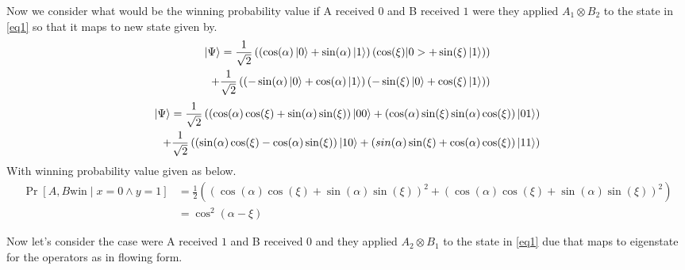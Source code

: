 Now we consider what would be the winning probability value if A received $0$ and B received $1$ were they applied $A_1\otimes B_2$ to the state in \ref{eq1} so that it maps  to new state given by.
\begin{equation*}
\begin{aligned}
\ket{\Psi} = \frac{1}{\sqrt{2}}\left( \left(\cos(\alpha)\ket{0}+\sin(\alpha)\ket{1} \right) \left(\cos(\xi)|0>+\sin(\xi)\ket{1} \right) \right)  \\  
+\frac{1}{\sqrt{2}} \left( \left(-\sin(\alpha)\ket{0}+\cos(\alpha)\ket{1} \right) \left(-\sin(\xi)\ket{0}+\cos(\xi)\ket{1} \right) \right)
\end{aligned}
\end{equation*}
\begin{equation*}
\begin{aligned}
\ket{\Psi }= \frac{1}{\sqrt{2}}\left(\left(\cos(\alpha) \cos(\xi)+\sin(\alpha) \sin(\xi)\right)\ket{00}+\left( \cos(\alpha)  \sin(\xi)\sin(\alpha)  \cos(\xi)\right)\ket{01}\right)\\
+\frac{1}{\sqrt{2}}\left( \left( \sin(\alpha)  \cos(\xi)-\cos(\alpha) \sin(\xi)\right)\ket{10}+\left(sin(\alpha)  \sin(\xi)+\cos(\alpha)  \cos(\xi)\right)\ket{11}\right)
\end{aligned}
\end{equation*}
With winning probability value given as below.
\begin{align} 
\Pr[A,B \text{win}  \mid  x=0 \wedge y=1]&=\frac{1}{2}\left(\left(\cos(\alpha)  \cos(\xi)+\sin(\alpha)\sin(\xi)\right)^2  +\left(\cos(\alpha)  \cos(\xi)+\sin(\alpha)\sin(\xi)\right)^2  \right)\nonumber\\ 
&=\cos^2(\alpha-\xi)\label{eq3}
\end{align}

Now let's consider  the case were  A received $1$ and B received $0$  and they applied $A_2\otimes B_1$ to the state in \ref{eq1}  due that maps to eigenstate for the operators as in flowing form.

